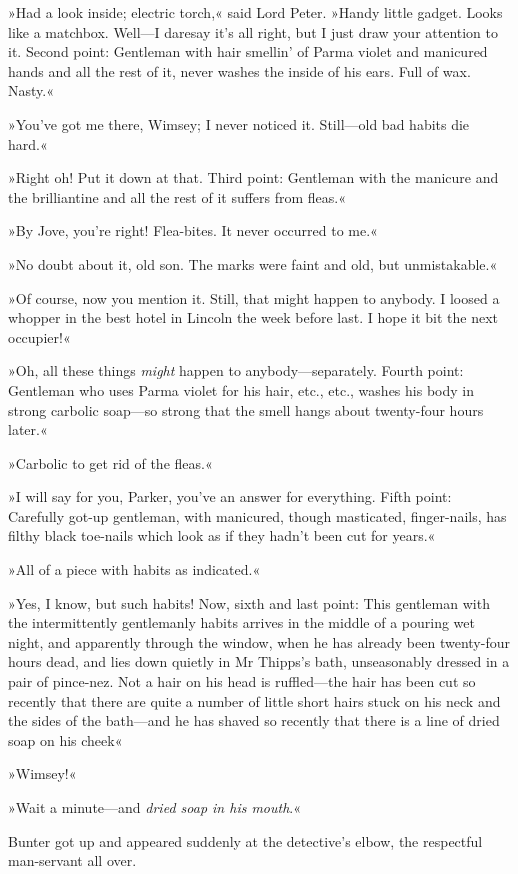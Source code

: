 »Had a look inside; electric torch,« said Lord Peter. »Handy little gadget. Looks like a matchbox. Well—I daresay it's all right, but I just draw your attention to it. Second point: Gentleman with hair smellin' of Parma violet and manicured hands and all the rest of it, never washes the inside of his ears. Full of wax. Nasty.«

»You've got me there, Wimsey; I never noticed it. Still—old bad habits die hard.«

»Right oh! Put it down at that. Third point: Gentleman with the manicure and the brilliantine and all the rest of it suffers from fleas.«

»By Jove, you're right! Flea-bites. It never occurred to me.«

»No doubt about it, old son. The marks were faint and old, but unmistakable.«

»Of course, now you mention it. Still, that might happen to anybody. I loosed a whopper in the best hotel in Lincoln the week before last. I hope it bit the next occupier!«

»Oh, all these things \textit{might} happen to anybody—separately. Fourth point: Gentleman who uses Parma violet for his hair, etc., etc., washes his body in strong carbolic soap—so strong that the smell hangs about twenty-four hours later.«

»Carbolic to get rid of the fleas.«

»I will say for you, Parker, you've an answer for everything. Fifth point: Carefully got-up gentleman, with manicured, though masticated, finger-nails, has filthy black toe-nails which look as if they hadn't been cut for years.«

»All of a piece with habits as indicated.«

»Yes, I know, but such habits! Now, sixth and last point: This gentleman with the intermittently gentlemanly habits arrives in the middle of a pouring wet night, and apparently through the window, when he has already been twenty-four hours dead, and lies down quietly in Mr Thipps's bath, unseasonably dressed in a pair of pince-nez. Not a hair on his head is ruffled—the hair has been cut so recently that there are quite a number of little short hairs stuck on his neck and the sides of the bath—and he has shaved so recently that there is a line of dried soap on his cheek\longdash«

»Wimsey!«

»Wait a minute—and \textit{dried soap in his mouth}.«

Bunter got up and appeared suddenly at the detective's elbow, the respectful man-servant all over.

